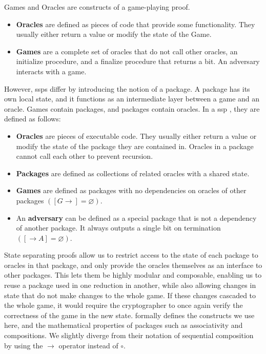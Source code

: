 Games and Oracles are constructs of a game-playing proof. 
\begin{itemize}
    \item \textbf{Oracles} are defined as pieces of code that provide some functionality. They usually either return a value or modify the state of the Game.
    \item \textbf{Games} are a complete set of oracles that do not call other oracles, an initialize procedure, and a finalize procedure that returns a bit. An adversary interacts with a game.
\end{itemize}
However, \acrlong{ssp}s differ by introducing the notion of a package. A package has its own local state, and it functions as an intermediate layer between a game and an oracle. Games contain packages, and packages contain oracles. In a \acrlong{ssp} \cite{brzuska_state_2018}, they are defined as follows:
\begin{itemize}
    \item \textbf{Oracles} are pieces of executable code. They usually either return a value or modify the state of the package they are contained in. Oracles in a package cannot call each other to prevent recursion.
    \item \textbf{Packages} are defined as collections of related oracles with a shared state.
    \item \textbf{Games} are defined as packages with no dependencies on oracles of other packages $([G\to] = \varnothing)$.
    \item An \textbf{adversary} can be defined as a special package that is not a dependency of another package. It always outputs a single bit on termination $([\to A] = \varnothing)$.
\end{itemize}

State separating proofs allow us to restrict access to the state of each package to oracles in that package, and only provide the oracles themselves as an interface to other packages. This lets them be highly modular and composable, enabling us to reuse a package used in one reduction in another, while also allowing changes in state that do not make changes to the whole game. If these changes cascaded to the whole game, it would require the cryptographer to once again verify the correctness of the game in the new state. \cite{brzuska_state_2018} formally defines the constructs we use here, and the mathematical properties of packages such as associativity and compositions. We slightly diverge from their notation of sequential composition by using the $\to$ operator instead of $\circ$. 


